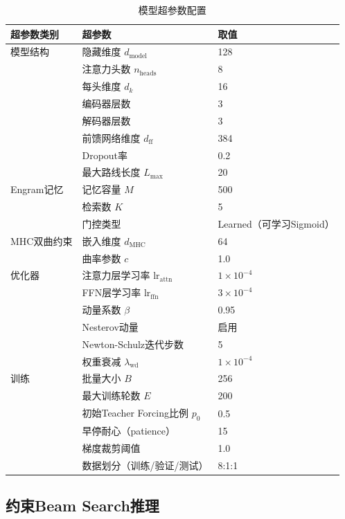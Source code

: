 \documentclass[12pt,a4paper]{ctexart}
\newenvironment{tighttable}
  {\setstretch{1.0}\small}
  {}
\begin{document}
\begin{table}[H]
\centering
\caption{模型超参数配置}
\label{tab:hyperparams}
\begin{tighttable}
\begin{tabular}{lll}
\toprule
超参数类别 & 超参数 & 取值 \\
\midrule
模型结构 & 隐藏维度 $d_{\text{model}}$ & 128 \\
 & 注意力头数 $n_{\text{heads}}$ & 8 \\
 & 每头维度 $d_k$ & 16 \\
 & 编码器层数 & 3 \\
 & 解码器层数 & 3 \\
 & 前馈网络维度 $d_{\text{ff}}$ & 384 \\
 & Dropout率 & 0.2 \\
 & 最大路线长度 $L_{\max}$ & 20 \\
\midrule
Engram记忆 & 记忆容量 $M$ & 500 \\
 & 检索数 $K$ & 5 \\
 & 门控类型 & Learned（可学习Sigmoid） \\
\midrule
MHC双曲约束 & 嵌入维度 $d_{\text{MHC}}$ & 64 \\
 & 曲率参数 $c$ & 1.0 \\
\midrule
优化器 & 注意力层学习率 $\text{lr}_{\text{attn}}$ & $1\times10^{-4}$ \\
 & FFN层学习率 $\text{lr}_{\text{ffn}}$ & $3\times10^{-4}$ \\
 & 动量系数 $\beta$ & 0.95 \\
 & Nesterov动量 & 启用 \\
 & Newton-Schulz迭代步数 & 5 \\
 & 权重衰减 $\lambda_{\text{wd}}$ & $1\times10^{-4}$ \\
\midrule
训练 & 批量大小 $B$ & 256 \\
 & 最大训练轮数 $E$ & 200 \\
 & 初始Teacher Forcing比例 $p_0$ & 0.5 \\
 & 早停耐心（patience） & 15 \\
 & 梯度裁剪阈值 & 1.0 \\
 & 数据划分（训练/验证/测试） & 8:1:1 \\
\bottomrule
\end{tabular}
\end{tighttable}
\end{table}

\subsection{约束Beam Search推理}
\end{document}
